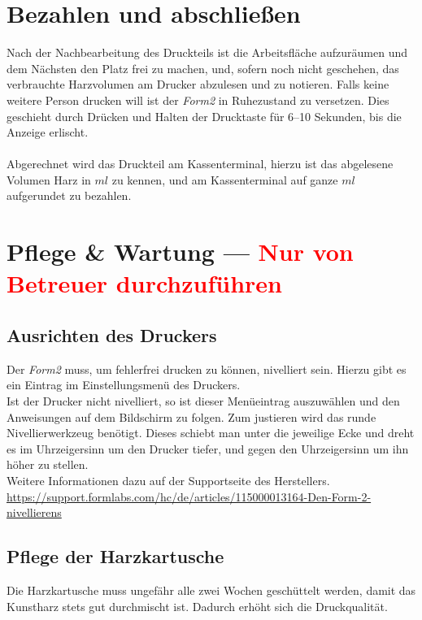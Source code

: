 \documentclass{\basedir/fablab-document}
\begin{document}

\section{Bezahlen und abschließen}

Nach der Nachbearbeitung des Druckteils ist die Arbeitsfläche aufzuräumen und dem Nächsten den Platz frei zu machen, und, sofern noch nicht geschehen, das verbrauchte Harzvolumen am Drucker abzulesen und zu notieren. Falls keine weitere Person drucken will ist der \textit{Form2} in Ruhezustand zu versetzen. Dies geschieht durch Drücken und Halten der Drucktaste für 6--10 Sekunden, bis die Anzeige erlischt. \\
\\
Abgerechnet wird das Druckteil am Kassenterminal, hierzu ist das abgelesene Volumen Harz in $ml$ zu kennen, und am Kassenterminal auf ganze $ml$ aufgerundet zu bezahlen.
\pagebreak


\section{Pflege \& Wartung --- \textcolor{red}{Nur von Betreuer durchzuführen}}

\subsection{Ausrichten des Druckers}
Der \textit{Form2} muss, um fehlerfrei drucken zu können, nivelliert sein. Hierzu gibt es ein Eintrag im Einstellungsmenü des Druckers.\\
Ist der Drucker nicht nivelliert, so ist dieser Menüeintrag auszuwählen und den Anweisungen auf dem Bildschirm zu folgen. Zum justieren wird das runde Nivellierwerkzeug benötigt. Dieses schiebt man unter die jeweilige Ecke und dreht es im Uhrzeigersinn um den Drucker tiefer, und gegen den Uhrzeigersinn um ihn höher zu stellen.\\
Weitere Informationen dazu auf der Supportseite des Herstellers.	\\
\url{https://support.formlabs.com/hc/de/articles/115000013164-Den-Form-2-nivellierens}

\subsection{Pflege der Harzkartusche}
Die Harzkartusche muss ungefähr alle zwei Wochen geschüttelt werden, damit das Kunstharz stets gut durchmischt ist. Dadurch erhöht sich die Druckqualität.
\end{document}
